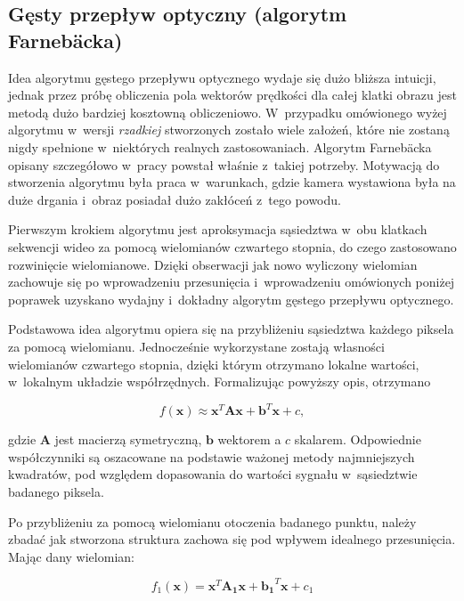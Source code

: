       \subsection{Gęsty przepływ optyczny (algorytm Farnebäcka)}\label{Subsection_DenseOpticalFlow}
      Idea algorytmu gęstego przepływu optycznego wydaje się dużo bliższa intuicji, jednak przez próbę obliczenia pola wektorów prędkości dla całej klatki obrazu jest metodą dużo bardziej kosztowną obliczeniowo. W~przypadku omówionego wyżej algorytmu w~wersji \textit{rzadkiej} stworzonych zostało wiele założeń, które nie zostaną nigdy spełnione w~niektórych realnych zastosowaniach. Algorytm Farnebäcka opisany szczegółowo w~pracy \cite{GunnarFarneback03} powstał właśnie z~takiej potrzeby. Motywacją do stworzenia algorytmu była praca w~warunkach, gdzie kamera wystawiona była na duże drgania i~obraz posiadał dużo zakłóceń z~tego powodu.

      Pierwszym krokiem algorytmu jest aproksymacja sąsiedztwa w~obu klatkach sekwencji wideo za pomocą wielomianów czwartego stopnia, do czego zastosowano rozwinięcie wielomianowe. Dzięki obserwacji jak nowo wyliczony wielomian zachowuje się po wprowadzeniu przesunięcia i~wprowadzeniu omówionych poniżej poprawek uzyskano wydajny i~dokładny algorytm gęstego przepływu optycznego.

      Podstawowa idea algorytmu opiera się na przybliżeniu sąsiedztwa każdego piksela za pomocą wielomianu. Jednocześnie wykorzystane zostają własności wielomianów czwartego stopnia, dzięki którym otrzymano lokalne wartości, w~lokalnym układzie współrzędnych. Formalizując powyższy opis, otrzymano

        \begin{equation}
          f(\mathbf{x}) \approx \mathbf{x}^{T}\mathbf{A}\mathbf{x} + \mathbf{b}^{T}\mathbf{x} + c,
        \end{equation}

      gdzie $\mathbf{A}$ jest macierzą symetryczną, $\mathbf{b}$ wektorem a $c$ skalarem. Odpowiednie współczynniki są oszacowane na podstawie ważonej metody najmniejszych kwadratów, pod względem dopasowania do wartości sygnału w~sąsiedztwie badanego piksela.

      Po przybliżeniu za pomocą wielomianu otoczenia badanego punktu, należy zbadać jak stworzona struktura zachowa się pod wpływem idealnego przesunięcia. Mając dany wielomian:

        \begin{equation}
          f_{1}(\mathbf{x}) = \mathbf{x}^{T}\mathbf{A_{1}}\mathbf{x} + \mathbf{b_{1}}^{T}\mathbf{x} + c_{1}
        \end{equation}

